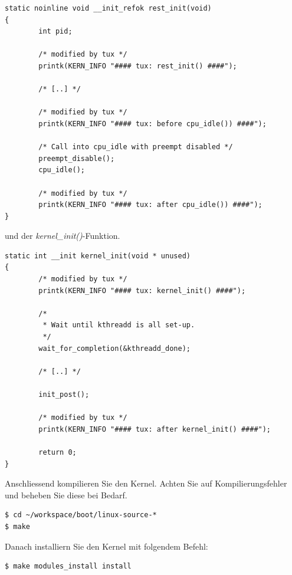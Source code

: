 \begin{lstlisting}[label=boot_rest_init,caption=init/main.c]
static noinline void __init_refok rest_init(void)
{
        int pid;

        /* modified by tux */
        printk(KERN_INFO "#### tux: rest_init() ####");

        /* [..] */

        /* modified by tux */
        printk(KERN_INFO "#### tux: before cpu_idle()) ####");

        /* Call into cpu_idle with preempt disabled */
        preempt_disable();
        cpu_idle();

        /* modified by tux */
        printk(KERN_INFO "#### tux: after cpu_idle()) ####");
}
\end{lstlisting}

und der \emph{kernel\_init()}-Funktion.

\begin{lstlisting}[label=boot_kernel_init,caption=init/main.c]
static int __init kernel_init(void * unused)
{
        /* modified by tux */
        printk(KERN_INFO "#### tux: kernel_init() ####");

        /*
         * Wait until kthreadd is all set-up.
         */
        wait_for_completion(&kthreadd_done);

        /* [..] */

        init_post();

        /* modified by tux */
        printk(KERN_INFO "#### tux: after kernel_init() ####");

        return 0;
}
\end{lstlisting}

Anschliessend kompilieren Sie den Kernel. Achten Sie auf Kompilierungsfehler und beheben
Sie diese bei Bedarf.
\begin{lstlisting}
$ cd ~/workspace/boot/linux-source-*
$ make
\end{lstlisting}

Danach installiern Sie den Kernel mit folgendem Befehl:
\begin{lstlisting}
$ make modules_install install
\end{lstlisting}


